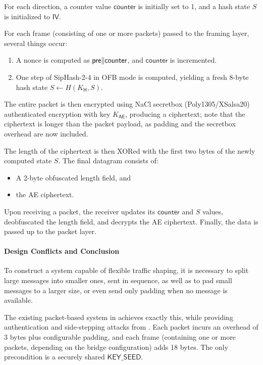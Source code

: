 For each direction, a counter value $\mathsf{counter}$ is initially set to 1, and a hash state $S$ is initialized to $\mathsf{IV}$.

For each frame (consisting of one or more packets) passed to the framing layer, several things occur:
\begin{enumerate}
    \item A nonce is computed as $ \mathsf{pre} \| \mathsf{counter}$, and $\mathsf{counter}$ is incremented.
    \item One step of SipHash-2-4 in OFB mode is computed, yielding a fresh 8-byte hash state $S \gets H(K_\mathsf{H}, S)$.
\end{enumerate}

The entire packet is then encrypted using NaCl secretbox (Poly1305/XSalsa20) authenticated encryption with key $K_\mathsf{AE}$, producing a ciphertext; note that the ciphertext is longer than the packet payload, as padding and the secretbox overhead are now included.

The length of the ciphertext is then XORed with the first two bytes of the newly computed state $S$. The final datagram consists of:
\begin{itemize}
    \item A 2-byte obfuscated length field, and
    \item the AE ciphertext.
\end{itemize}

Upon receiving a packet, the receiver updates its $\mathsf{counter}$ and $S$ values, deobfuscated the length field, and decrypts the AE ciphertext. Finally, the data is passed up to the packet layer.

\paragraph{Design Conflicts and Conclusion}

To construct a system capable of flexible traffic shaping, it is necessary to split large messages into smaller ones, sent in sequence, as well as to pad small messages to a larger size, or even send only padding when no message is available.

The existing packet-based system in \obfsfour{} achieves exactly this, while providing authentication and side-stepping attacks from \cite{SP:AlbPatWat09}. Each packet incurs an overhead of 3 bytes plus configurable padding, and each frame (containing one or more packets, depending on the bridge configuration) adds 18 bytes.
The only precondition is a securely shared $\mathsf{KEY\_SEED}$.

